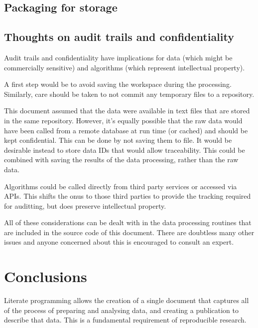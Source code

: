 \documentclass[11pt,]{article}
\begin{document}
\hypertarget{packaging-for-storage}{%
\subsection{Packaging for storage}\label{packaging-for-storage}}

\hypertarget{thoughts-on-audit-trails-and-confidentiality}{%
\subsection{Thoughts on audit trails and confidentiality}\label{thoughts-on-audit-trails-and-confidentiality}}

Audit trails and confidentiality have implications for data (which might be commercially sensitive) and algorithms (which represent intellectual property).

A first step would be to avoid saving the workspace during the processing. Similarly, care should be taken to not commit any temporary files to a repository.

This document assumed that the data were available in text files that are stored in the same repository. However, it's equally possible that the raw data would have been called from a remote database at run time (or cached) and should be kept confidential. This can be done by not saving them to file. It would be desirable instead to store data IDs that would allow traceability. This could be combined with saving the results of the data processing, rather than the raw data.

Algorithms could be called directly from third party services or accessed via APIs. This shifts the onus to those third parties to provide the tracking required for auditting, but does preserve intellectual property.

All of these considerations can be dealt with in the data processing routines that are included in the source code of this document. There are doubtless many other issues and anyone concerned about this is encouraged to consult an expert.

\hypertarget{conclusions}{%
\section{Conclusions}\label{conclusions}}

Literate programming allows the creation of a single document that captures all of the process of preparing and analysing data, and creating a publication to describe that data. This is a fundamental requirement of reproducible research.
\end{document}
